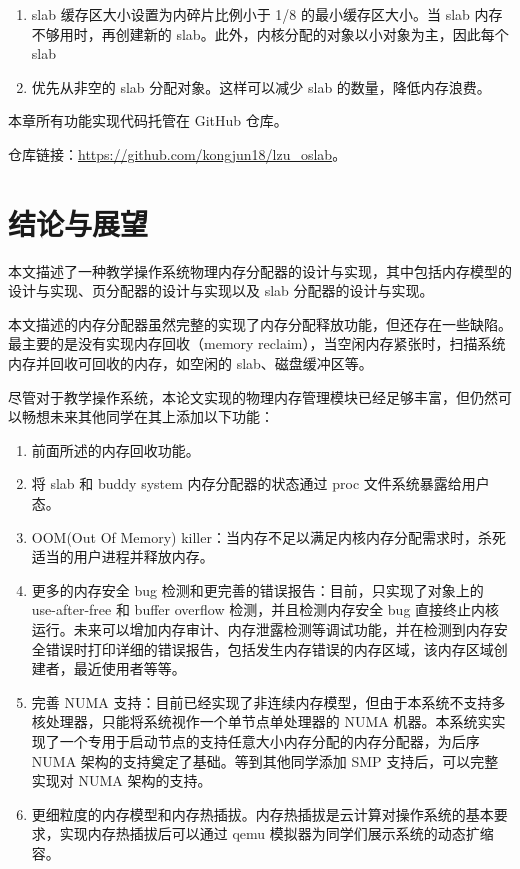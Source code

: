 \documentclass[AutoFakeBold]{LZUThesis}
\begin{document}
\begin{sloppypar}
\begin{enumerate}
\def\labelenumi{\arabic{enumi}.}
\item
  slab 缓存区大小设置为内碎片比例小于 1/8 的最小缓存区大小。当 slab
  内存不够用时，再创建新的
  slab。此外，内核分配的对象以小对象为主，因此每个 slab
\item
  优先从非空的 slab 分配对象。这样可以减少 slab 的数量，降低内存浪费。
\end{enumerate}

本章所有功能实现代码托管在 GitHub 仓库。

仓库链接：\href{https://github.com/kongjun18/lzu_oslab}{https://github.com/kongjun18/lzu\_oslab}。

\chapter{结论与展望}

本文描述了一种教学操作系统物理内存分配器的设计与实现，其中包括内存模型的设计与实现、页分配器的设计与实现以及
slab
分配器的设计与实现。

本文描述的内存分配器虽然完整的实现了内存分配释放功能，但还存在一些缺陷。最主要的是没有实现内存回收（memory reclaim），当空闲内存紧张时，扫描系统内存并回收可回收的内存，如空闲的 slab、磁盘缓冲区等。

尽管对于教学操作系统，本论文实现的物理内存管理模块已经足够丰富，但仍然可以畅想未来其他同学在其上添加以下功能：

\begin{enumerate}
\def\labelenumi{\arabic{enumi}.}
\item
  前面所述的内存回收功能。
\item
  将 slab 和 buddy system 内存分配器的状态通过 proc 文件系统暴露给用户态。
\item
  OOM(Out Of Memory)
  killer：当内存不足以满足内核内存分配需求时，杀死适当的用户进程并释放内存。
\item
  更多的内存安全 bug 检测和更完善的错误报告：目前，只实现了对象上的
  use-after-free 和 buffer overflow 检测，并且检测内存安全 bug
  直接终止内核运行。未来可以增加内存审计、内存泄露检测等调试功能，并在检测到内存安全错误时打印详细的错误报告，包括发生内存错误的内存区域，该内存区域创建者，最近使用者等等。
\item
  完善 NUMA
  支持：目前已经实现了非连续内存模型，但由于本系统不支持多核处理器，只能将系统视作一个单节点单处理器的
  NUMA
  机器。本系统实实现了一个专用于启动节点的支持任意大小内存分配的内存分配器，为后序
  NUMA 架构的支持奠定了基础。等到其他同学添加 SMP 支持后，可以完整实现对
  NUMA 架构的支持。
\item
  更细粒度的内存模型和内存热插拔。内存热插拔是云计算对操作系统的基本要求，实现内存热插拔后可以通过
  qemu 模拟器为同学们展示系统的动态扩缩容。
\end{enumerate}






\end{sloppypar}
\end{document}
